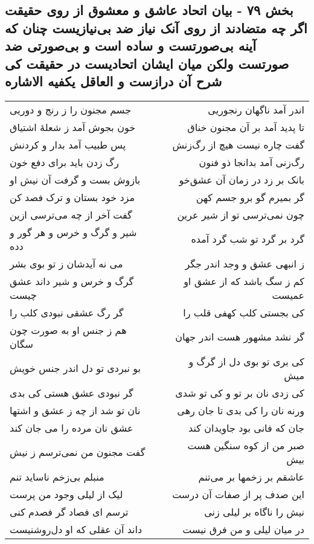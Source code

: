 \begin{center}
\section*{بخش ۷۹ - بیان اتحاد عاشق و معشوق از روی حقیقت اگر چه متضادند  از روی آنک نیاز ضد بی‌نیازیست چنان که آینه بی‌صورتست و  ساده است و بی‌صورتی ضد صورتست ولکن میان ایشان اتحادیست  در حقیقت کی شرح آن درازست و العاقل یکفیه الاشاره}
\label{sec:sh079}
\begin{longtable}{l p{0.5cm} r}
جسم مجنون را ز رنج و دوریی
&&
اندر آمد ناگهان رنجوریی
\\
خون بجوش آمد ز شعلهٔ اشتیاق
&&
تا پدید آمد بر آن مجنون خناق
\\
پس طبیب آمد بدار و کردنش
&&
گفت چاره نیست هیچ از رگ‌زنش
\\
رگ زدن باید برای دفع خون
&&
رگ‌زنی آمد بدانجا ذو فنون
\\
بازوش بست و گرفت آن نیش او
&&
بانک بر زد در زمان آن عشق‌خو
\\
مزد خود بستان و ترک فصد کن
&&
گر بمیرم گو برو جسم کهن
\\
گفت آخر از چه می‌ترسی ازین
&&
چون نمی‌ترسی تو از شیر عرین
\\
شیر و گرگ و خرس و هر گور و دده
&&
گرد بر گرد تو شب گرد آمده
\\
می نه آیدشان ز تو بوی بشر
&&
ز انبهی عشق و وجد اندر جگر
\\
گرگ و خرس و شیر داند عشق چیست
&&
کم ز سگ باشد که از عشق او عمیست
\\
گر رگ عشقی نبودی کلب را
&&
کی بجستی کلب کهفی قلب را
\\
هم ز جنس او به صورت چون سگان
&&
گر نشد مشهور هست اندر جهان
\\
بو نبردی تو دل اندر جنس خویش
&&
کی بری تو بوی دل از گرگ و میش
\\
گر نبودی عشق هستی کی بدی
&&
کی زدی نان بر تو و کی تو شدی
\\
نان تو شد از چه ز عشق و اشتها
&&
ورنه نان را کی بدی تا جان رهی
\\
عشق نان مرده را می جان کند
&&
جان که فانی بود جاویدان کند
\\
گفت مجنون من نمی‌ترسم ز نیش
&&
صبر من از کوه سنگین هست بیش
\\
منبلم بی‌زخم ناساید تنم
&&
عاشقم بر زخمها بر می‌تنم
\\
لیک از لیلی وجود من پرست
&&
این صدف پر از صفات آن درست
\\
ترسم ای فصاد گر فصدم کنی
&&
نیش را ناگاه بر لیلی زنی
\\
داند آن عقلی که او دل‌روشنیست
&&
در میان لیلی و من فرق نیست
\\
\end{longtable}
\end{center}
